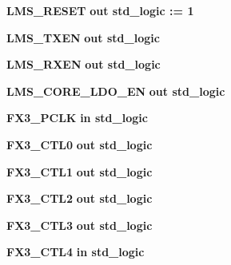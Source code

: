 \begin{DoxyCompactItemize}
\item 
{\bf L\+M\+S\+\_\+\+R\+E\+S\+ET}  {\bfseries {\bfseries \textcolor{keywordflow}{out}\textcolor{vhdlchar}{ }}} {\bfseries \textcolor{comment}{std\+\_\+logic}\textcolor{vhdlchar}{ }\textcolor{vhdlchar}{ }\textcolor{vhdlchar}{\+:}\textcolor{vhdlchar}{=}\textcolor{vhdlchar}{ }\textcolor{vhdlchar}{ }\textcolor{vhdlchar}{\textquotesingle{}}\textcolor{vhdlchar}{ } \textcolor{vhdldigit}{1} \textcolor{vhdlchar}{ }\textcolor{vhdlchar}{\textquotesingle{}}\textcolor{vhdlchar}{ }} 
\item 
{\bf L\+M\+S\+\_\+\+T\+X\+EN}  {\bfseries {\bfseries \textcolor{keywordflow}{out}\textcolor{vhdlchar}{ }}} {\bfseries \textcolor{comment}{std\+\_\+logic}\textcolor{vhdlchar}{ }} 
\item 
{\bf L\+M\+S\+\_\+\+R\+X\+EN}  {\bfseries {\bfseries \textcolor{keywordflow}{out}\textcolor{vhdlchar}{ }}} {\bfseries \textcolor{comment}{std\+\_\+logic}\textcolor{vhdlchar}{ }} 
\item 
{\bf L\+M\+S\+\_\+\+C\+O\+R\+E\+\_\+\+L\+D\+O\+\_\+\+EN}  {\bfseries {\bfseries \textcolor{keywordflow}{out}\textcolor{vhdlchar}{ }}} {\bfseries \textcolor{comment}{std\+\_\+logic}\textcolor{vhdlchar}{ }} 
\item 
{\bf F\+X3\+\_\+\+P\+C\+LK}  {\bfseries {\bfseries \textcolor{keywordflow}{in}\textcolor{vhdlchar}{ }}} {\bfseries \textcolor{comment}{std\+\_\+logic}\textcolor{vhdlchar}{ }} 
\item 
{\bf F\+X3\+\_\+\+C\+T\+L0}  {\bfseries {\bfseries \textcolor{keywordflow}{out}\textcolor{vhdlchar}{ }}} {\bfseries \textcolor{comment}{std\+\_\+logic}\textcolor{vhdlchar}{ }} 
\item 
{\bf F\+X3\+\_\+\+C\+T\+L1}  {\bfseries {\bfseries \textcolor{keywordflow}{out}\textcolor{vhdlchar}{ }}} {\bfseries \textcolor{comment}{std\+\_\+logic}\textcolor{vhdlchar}{ }} 
\item 
{\bf F\+X3\+\_\+\+C\+T\+L2}  {\bfseries {\bfseries \textcolor{keywordflow}{out}\textcolor{vhdlchar}{ }}} {\bfseries \textcolor{comment}{std\+\_\+logic}\textcolor{vhdlchar}{ }} 
\item 
{\bf F\+X3\+\_\+\+C\+T\+L3}  {\bfseries {\bfseries \textcolor{keywordflow}{out}\textcolor{vhdlchar}{ }}} {\bfseries \textcolor{comment}{std\+\_\+logic}\textcolor{vhdlchar}{ }} 
\item 
{\bf F\+X3\+\_\+\+C\+T\+L4}  {\bfseries {\bfseries \textcolor{keywordflow}{in}\textcolor{vhdlchar}{ }}} {\bfseries \textcolor{comment}{std\+\_\+logic}\textcolor{vhdlchar}{ }} 
\item 

\end{DoxyCompactItemize}
